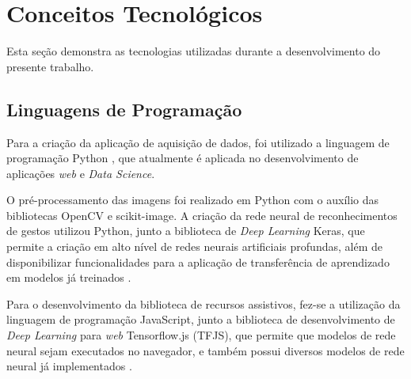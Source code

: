 
\section{Conceitos Tecnológicos}

Esta seção demonstra as tecnologias utilizadas durante a desenvolvimento do presente trabalho.

\subsection{Linguagens de Programação}

\par Para a criação da aplicação de aquisição de dados, foi utilizado a linguagem de programação Python \cite{Python2019}, que atualmente é aplicada no desenvolvimento de aplicações \textit{web} e \textit{Data Science}.

\par O pré-processamento das imagens foi realizado em Python com o auxílio das bibliotecas OpenCV e scikit-image. A criação da rede neural de reconhecimentos de gestos utilizou Python, junto a biblioteca de \textit{Deep Learning} Keras, que permite a criação em alto nível de redes neurais artificiais profundas, além de disponibilizar funcionalidades para a aplicação de transferência de aprendizado em modelos já treinados \cite{chollet2015}.

\par Para o desenvolvimento da biblioteca de recursos assistivos, fez-se a utilização da linguagem de programação JavaScript, junto a biblioteca de desenvolvimento de \textit{Deep Learning} para \textit{web} Tensorflow.js (TFJS), que permite que modelos de rede neural sejam executados no navegador, e também possui diversos modelos de rede neural já implementados \cite{tensorflowjs2019}.

